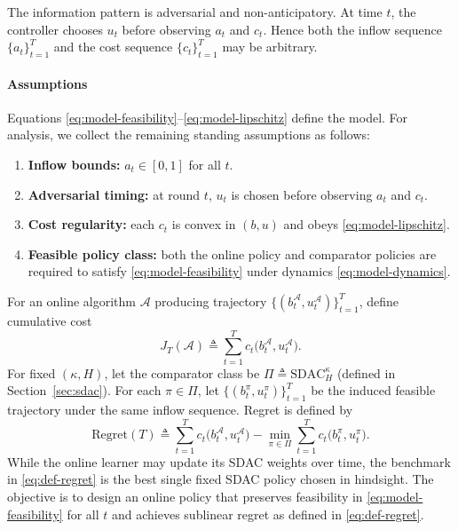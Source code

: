 \documentclass[11pt]{article}
\begin{document}
The information pattern is adversarial and non-anticipatory. At time $t$, the controller chooses $u_t$ before observing $a_t$ and $c_t$. Hence both the inflow sequence $\{a_t\}_{t=1}^T$ and the cost sequence $\{c_t\}_{t=1}^T$ may be arbitrary.

\paragraph{Assumptions}
Equations \eqref{eq:model-feasibility}--\eqref{eq:model-lipschitz} define the model. For analysis, we collect the remaining standing assumptions as follows:
\begin{enumerate}
    \item \textbf{Inflow bounds:} $a_t\in[0,1]$ for all $t$.
    \item \textbf{Adversarial timing:} at round $t$, $u_t$ is chosen before observing $a_t$ and $c_t$.
    \item \textbf{Cost regularity:} each $c_t$ is convex in $(b,u)$ and obeys \eqref{eq:model-lipschitz}.
    \item \textbf{Feasible policy class:} both the online policy and comparator policies are required to satisfy \eqref{eq:model-feasibility} under dynamics \eqref{eq:model-dynamics}.
\end{enumerate}

For an online algorithm $\mathcal{A}$ producing trajectory $\{(b_t^{\mathcal{A}},u_t^{\mathcal{A}})\}_{t=1}^T$, define cumulative cost
\begin{equation}
\label{eq:def-cumulative-cost}
J_T(\mathcal{A}) \triangleq \sum_{t=1}^T c_t\bigl(b_t^{\mathcal{A}},u_t^{\mathcal{A}}\bigr).
\end{equation}
For fixed $(\kappa,H)$, let the comparator class be $\Pi\triangleq\mathrm{SDAC}_H^{\kappa}$ (defined in Section~\ref{sec:sdac}). For each $\pi\in\Pi$, let $\{(b_t^{\pi},u_t^{\pi})\}_{t=1}^T$ be the induced feasible trajectory under the same inflow sequence. Regret is defined by
\begin{equation}
\label{eq:def-regret}
\mathrm{Regret}(T)
\triangleq
\sum_{t=1}^T c_t\bigl(b_t^{\mathcal{A}},u_t^{\mathcal{A}}\bigr)
-
\min_{\pi\in\Pi}
\sum_{t=1}^T c_t\bigl(b_t^{\pi},u_t^{\pi}\bigr).
\end{equation}
While the online learner may update its SDAC weights over time, the benchmark in \eqref{eq:def-regret} is the best single fixed SDAC policy chosen in hindsight.
The objective is to design an online policy that preserves feasibility in \eqref{eq:model-feasibility} for all $t$ and achieves sublinear regret as defined in \eqref{eq:def-regret}.
\end{document}
